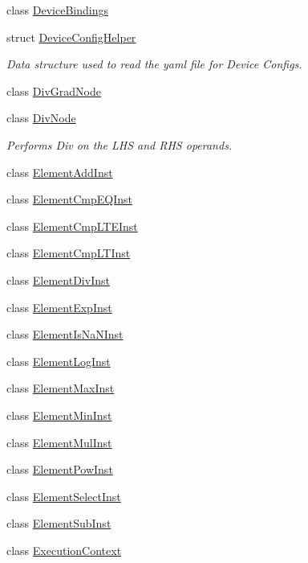 \begin{DoxyCompactItemize}
class \hyperlink{classglow_1_1_device_bindings}{Device\+Bindings}
\item 
struct \hyperlink{structglow_1_1_device_config_helper}{Device\+Config\+Helper}
\begin{DoxyCompactList}\small\item\em Data structure used to read the yaml file for Device Configs. \end{DoxyCompactList}\item 
class \hyperlink{classglow_1_1_div_grad_node}{Div\+Grad\+Node}
\item 
class \hyperlink{classglow_1_1_div_node}{Div\+Node}
\begin{DoxyCompactList}\small\item\em Performs Div on the L\+HS and R\+HS operands. \end{DoxyCompactList}\item 
class \hyperlink{classglow_1_1_element_add_inst}{Element\+Add\+Inst}
\item 
class \hyperlink{classglow_1_1_element_cmp_e_q_inst}{Element\+Cmp\+E\+Q\+Inst}
\item 
class \hyperlink{classglow_1_1_element_cmp_l_t_e_inst}{Element\+Cmp\+L\+T\+E\+Inst}
\item 
class \hyperlink{classglow_1_1_element_cmp_l_t_inst}{Element\+Cmp\+L\+T\+Inst}
\item 
class \hyperlink{classglow_1_1_element_div_inst}{Element\+Div\+Inst}
\item 
class \hyperlink{classglow_1_1_element_exp_inst}{Element\+Exp\+Inst}
\item 
class \hyperlink{classglow_1_1_element_is_na_n_inst}{Element\+Is\+Na\+N\+Inst}
\item 
class \hyperlink{classglow_1_1_element_log_inst}{Element\+Log\+Inst}
\item 
class \hyperlink{classglow_1_1_element_max_inst}{Element\+Max\+Inst}
\item 
class \hyperlink{classglow_1_1_element_min_inst}{Element\+Min\+Inst}
\item 
class \hyperlink{classglow_1_1_element_mul_inst}{Element\+Mul\+Inst}
\item 
class \hyperlink{classglow_1_1_element_pow_inst}{Element\+Pow\+Inst}
\item 
class \hyperlink{classglow_1_1_element_select_inst}{Element\+Select\+Inst}
\item 
class \hyperlink{classglow_1_1_element_sub_inst}{Element\+Sub\+Inst}
\item 
class \hyperlink{classglow_1_1_execution_context}{Execution\+Context}

\end{DoxyCompactItemize}
